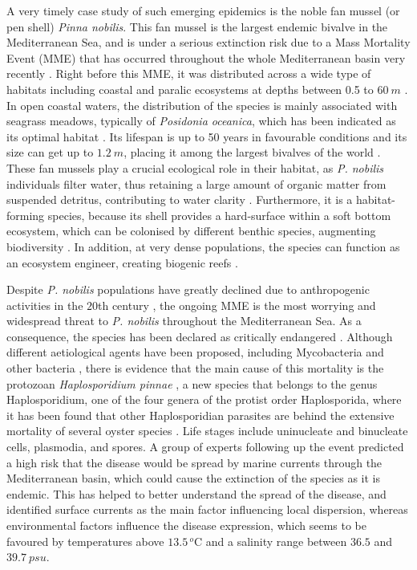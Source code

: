 A very timely case study of such emerging epidemics is the noble fan
mussel (or pen shell) \textit{Pinna nobilis}. This fan mussel is the largest
endemic bivalve in the Mediterranean Sea, and is under a serious extinction
risk due to a Mass Mortality Event (MME) that has occurred throughout the whole
Mediterranean basin very recently \cite{March, ZOTOU2020, VAZQUEZ2017}. Right
before this MME, it was distributed across a wide type of habitats including
coastal and paralic ecosystems at depths between 0.5 to $\SI{60}{m}$
\cite{butler1993ecology, PRADO2020105220}. In open coastal waters, the
distribution of the species is mainly associated with seagrass meadows,
typically of \textit{Posidonia oceanica}, which has been indicated as its
optimal habitat \cite{Hendriks2011}.
Its lifespan is up to 50 years in favourable conditions and its size can
get up to $\SI{1.2}{m}$, placing it among the largest bivalves of the  world
\cite{Cabanellas2019}. These fan mussels play a crucial ecological role in
their habitat, as \textit{P. nobilis} individuals filter water, thus retaining
a large amount of organic matter from suspended detritus, contributing to water
clarity \cite{TRIGOS2014}. Furthermore, it is a habitat-forming species,
because its shell provides a hard-surface within a soft bottom ecosystem, which
can be colonised by different benthic species, augmenting biodiversity
\cite{Cabanellas2019}. In addition, at very dense populations, the species can
function as an ecosystem engineer, creating biogenic reefs
\cite{katsanevakis2016transplantation}.

Despite \textit{P. nobilis} populations have greatly declined due to
anthropogenic activities in the $20$th century \cite{VAZQUEZ2017}, the ongoing
MME is the most worrying and widespread threat to \textit{P. nobilis}
throughout the Mediterranean Sea. As a consequence, the species has been
declared as critically endangered \cite{IUCN}. Although different aetiological
agents have been proposed, including Mycobacteria and other bacteria
\cite{Carella2019, Saric2020, Scarpa2020}, there is evidence that the main
cause of this mortality is the protozoan \textit{Haplosporidium pinnae}
\cite{DARRIBA201714, CATANESE20189, Box2020}, a new species that belongs to
the genus Haplosporidium, one of the four genera of the protist order
Haplosporida, where it has been found that other Haplosporidian parasites are
behind the extensive mortality of several oyster species \cite{Burreson2004,
    Arzul2015}. Life stages include uninucleate and binucleate cells,
plasmodia,
and spores. A group of experts following up the event predicted a high risk
that the disease would be spread by marine currents through the Mediterranean
basin, which could cause the extinction of the species \cite{Cabanellas2019}
as it is endemic. This has helped to better understand the spread of the
disease, and identified surface currents as the main factor influencing local
dispersion, whereas environmental factors influence the disease expression,
which seems to be favoured by temperatures above $\SI{13.5}\,{}^o$C and a
salinity range between $36.5$ and $\SI{39.7}{psu}$.

